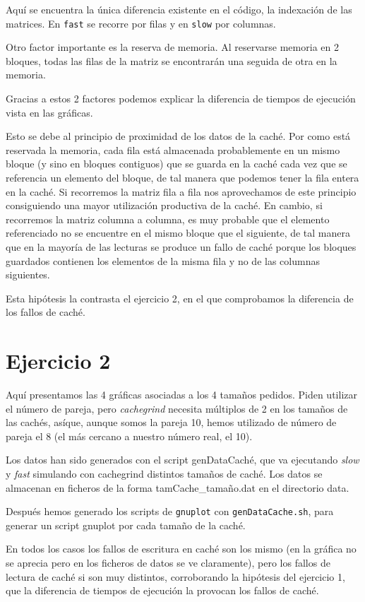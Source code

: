 \documentclass[nochap]{apuntes}
\begin{document}
Aquí se encuentra la única diferencia existente en el código, la indexación de las matrices. En \texttt{fast} se recorre por filas y en \texttt{slow} por columnas.

Otro factor importante es la reserva de memoria. Al reservarse memoria en 2 bloques, todas las filas de la matriz se encontrarán una seguida de otra en la memoria.

Gracias a estos 2 factores podemos explicar la diferencia de tiempos de ejecución vista en las gráficas.

Esto se debe al principio de proximidad de los datos de la caché. Por como está reservada la memoria, cada fila está almacenada probablemente en un mismo bloque (y sino en bloques contiguos) que se guarda en la caché cada vez que se referencia un elemento del bloque, de tal manera que podemos tener la fila entera en la caché. Si recorremos la matriz fila a fila nos aprovechamos de este principio consiguiendo una mayor utilización productiva de la caché. En cambio, si recorremos la matriz columna a columna, es muy probable que el elemento referenciado no se encuentre en el mismo bloque que el siguiente, de tal manera que en la mayoría de las lecturas se produce un fallo de caché porque los bloques guardados contienen los elementos de la misma fila y no de las columnas siguientes.

Esta hipótesis la contrasta el ejercicio 2, en el que comprobamos la diferencia de los fallos de caché.

\section{Ejercicio 2}

Aquí presentamos las 4 gráficas asociadas a los 4 tamaños pedidos. Piden utilizar el número de pareja, pero \emph{cachegrind} necesita múltiplos de 2 en los tamaños de las cachés, asíque, aunque somos la pareja 10, hemos utilizado de número de pareja el 8 (el más cercano a nuestro número real, el 10).

Los datos han sido generados con el script genDataCaché, que va ejecutando \emph{slow} y \emph{fast} simulando con cachegrind distintos tamaños de caché. Los datos se almacenan en ficheros de la forma tamCache\_tamaño.dat en el directorio data. 

Después hemos generado los scripts de \texttt{gnuplot} con \texttt{genDataCache.sh}, para generar un script gnuplot por cada tamaño de la caché.

En todos los casos los fallos de escritura en caché son los mismo (en la gráfica no se aprecia pero en los ficheros de datos se ve claramente), pero los fallos de lectura de caché si son muy distintos, corroborando la hipótesis del ejercicio 1, que la diferencia de tiempos de ejecución la provocan los fallos de caché.
\end{document}
